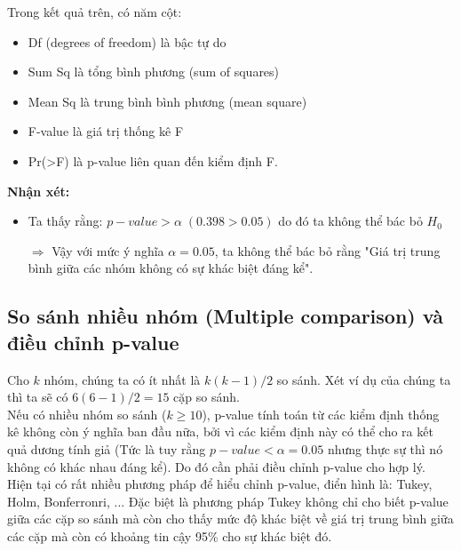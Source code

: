 \documentclass[a4paper,12pt]{article}
\begin{document}
	Trong kết quả trên, có năm cột: 
	\begin{itemize}
		\item Df (degrees of freedom) là bậc tự do
		\item Sum Sq là tổng bình phương (sum of squares)
		\item Mean Sq là trung bình bình phương (mean square)
		\item F-value là giá trị thống kê F
		\item Pr(>F) là p-value liên quan đến kiểm định F.
	\end{itemize}
	
	\textbf{Nhận xét:}\\
	\begin{itemize}
		\item Ta thấy rằng: $p-value > \alpha \; (0.398 > 0.05)$ do đó ta không thể bác bỏ $H_0$
		\item[$\Rightarrow$] Vậy với mức ý nghĩa $\alpha = 0.05$, ta không thể bác bỏ rằng "Giá trị trung bình giữa các nhóm không có sự khác biệt đáng kể".
	\end{itemize}
	
	\subsection{So sánh nhiều nhóm (Multiple comparison) và điều chỉnh p-value}
	Cho $k$ nhóm, chúng ta có ít nhất là $k(k-1)/2$ so sánh. Xét ví dụ của chúng ta thì ta sẽ có $6(6-1)/2 = 15$ cặp so sánh.\\
	
	Nếu có nhiều nhóm so sánh ($k \geq 10$), p-value tính toán từ các kiểm định thống kê không còn ý nghĩa ban đầu nữa, bởi vì các kiểm định này có thể cho ra kết quả dương tính giả (Tức là tuy rằng $p-value < \alpha = 0.05$ nhưng thực sự thì nó không có khác nhau đáng kể). Do đó cần phải điều chỉnh p-value cho hợp lý.\\
	
	Hiện tại có rất nhiều phương pháp để hiểu chỉnh p-value, điển hình là: Tukey, Holm, Bonferronri, ... 
	Đặc biệt là phương pháp Tukey không chỉ cho biết p-value giữa các cặp so sánh mà còn cho thấy mức độ khác biệt về giá trị trung bình giữa các cặp mà còn có khoảng tin cậy 95\% cho sự khác biệt đó.\\
	
\end{document}
